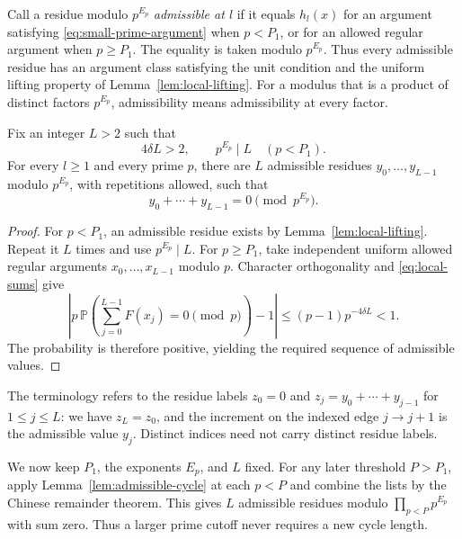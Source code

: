 Call a residue modulo $p^{E_p}$ \emph{admissible at $l$} if it equals
$h_l(x)$ for an argument satisfying \eqref{eq:small-prime-argument}
when $p<P_1$, or for an allowed regular argument when $p\ge P_1$.
The equality is taken modulo $p^{E_p}$.  Thus every admissible residue
has an argument class satisfying the unit condition and the uniform lifting property of
Lemma~\ref{lem:local-lifting}.  For a modulus that is a product of
distinct factors $p^{E_p}$, admissibility means admissibility at every
factor.

\begin{lemma}\label{lem:admissible-cycle}
Fix an integer $L>2$ such that
\begin{equation}\label{eq:cycle-length}
 4\delta L>2,\qquad p^{E_p}\mid L\quad(p<P_1).
\end{equation}
For every $l\ge1$ and every prime $p$, there are $L$ admissible residues
$y_0,\ldots,y_{L-1}$ modulo $p^{E_p}$, with repetitions allowed, such
that
\[
 y_0+\cdots+y_{L-1}=0\pmod{p^{E_p}}.
\]
\end{lemma}

\begin{proof}
For $p<P_1$, an admissible residue exists by
Lemma~\ref{lem:local-lifting}.  Repeat it $L$ times and use
$p^{E_p}\mid L$.  For $p\ge P_1$, take independent uniform allowed
regular arguments $x_0,\ldots,x_{L-1}$ modulo $p$.  Character
orthogonality and \eqref{eq:local-sums} give
\[
 \left|p\,\mathbb P\left(\sum_{j=0}^{L-1}F(x_j)=0\pmod p\right)-1\right|
 \le (p-1)p^{-4\delta L}<1.
\]
The probability is therefore positive, yielding the required sequence
of admissible values.
\end{proof}

The terminology refers to the residue labels
$z_0=0$ and $z_j=y_0+\cdots+y_{j-1}$ for $1\le j\le L$:
we have $z_L=z_0$, and the increment on the indexed edge $j\to j+1$
is the admissible value $y_j$.  Distinct indices need not carry distinct
residue labels.

We now keep $P_1$, the exponents $E_p$, and $L$ fixed.  For any later
threshold $P>P_1$, apply Lemma~\ref{lem:admissible-cycle} at each $p<P$
and combine the lists by the Chinese remainder theorem.  This gives $L$
admissible residues modulo $\prod_{p<P}p^{E_p}$ with sum zero.  Thus a
larger prime cutoff never requires a new cycle length.
